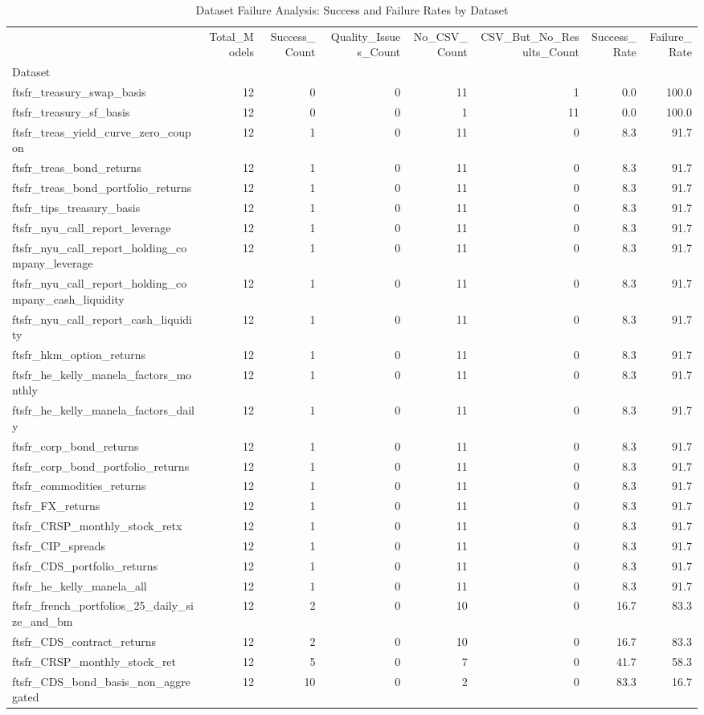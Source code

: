 \begin{table}
\caption{Dataset Failure Analysis: Success and Failure Rates by Dataset}
\label{tab:dataset_failures}
\begin{tabular}{lrrrrrrr}
\toprule
 & Total_Models & Success_Count & Quality_Issues_Count & No_CSV_Count & CSV_But_No_Results_Count & Success_Rate & Failure_Rate \\
Dataset &  &  &  &  &  &  &  \\
\midrule
ftsfr_treasury_swap_basis & 12 & 0 & 0 & 11 & 1 & 0.0 & 100.0 \\
ftsfr_treasury_sf_basis & 12 & 0 & 0 & 1 & 11 & 0.0 & 100.0 \\
ftsfr_treas_yield_curve_zero_coupon & 12 & 1 & 0 & 11 & 0 & 8.3 & 91.7 \\
ftsfr_treas_bond_returns & 12 & 1 & 0 & 11 & 0 & 8.3 & 91.7 \\
ftsfr_treas_bond_portfolio_returns & 12 & 1 & 0 & 11 & 0 & 8.3 & 91.7 \\
ftsfr_tips_treasury_basis & 12 & 1 & 0 & 11 & 0 & 8.3 & 91.7 \\
ftsfr_nyu_call_report_leverage & 12 & 1 & 0 & 11 & 0 & 8.3 & 91.7 \\
ftsfr_nyu_call_report_holding_company_leverage & 12 & 1 & 0 & 11 & 0 & 8.3 & 91.7 \\
ftsfr_nyu_call_report_holding_company_cash_liquidity & 12 & 1 & 0 & 11 & 0 & 8.3 & 91.7 \\
ftsfr_nyu_call_report_cash_liquidity & 12 & 1 & 0 & 11 & 0 & 8.3 & 91.7 \\
ftsfr_hkm_option_returns & 12 & 1 & 0 & 11 & 0 & 8.3 & 91.7 \\
ftsfr_he_kelly_manela_factors_monthly & 12 & 1 & 0 & 11 & 0 & 8.3 & 91.7 \\
ftsfr_he_kelly_manela_factors_daily & 12 & 1 & 0 & 11 & 0 & 8.3 & 91.7 \\
ftsfr_corp_bond_returns & 12 & 1 & 0 & 11 & 0 & 8.3 & 91.7 \\
ftsfr_corp_bond_portfolio_returns & 12 & 1 & 0 & 11 & 0 & 8.3 & 91.7 \\
ftsfr_commodities_returns & 12 & 1 & 0 & 11 & 0 & 8.3 & 91.7 \\
ftsfr_FX_returns & 12 & 1 & 0 & 11 & 0 & 8.3 & 91.7 \\
ftsfr_CRSP_monthly_stock_retx & 12 & 1 & 0 & 11 & 0 & 8.3 & 91.7 \\
ftsfr_CIP_spreads & 12 & 1 & 0 & 11 & 0 & 8.3 & 91.7 \\
ftsfr_CDS_portfolio_returns & 12 & 1 & 0 & 11 & 0 & 8.3 & 91.7 \\
ftsfr_he_kelly_manela_all & 12 & 1 & 0 & 11 & 0 & 8.3 & 91.7 \\
ftsfr_french_portfolios_25_daily_size_and_bm & 12 & 2 & 0 & 10 & 0 & 16.7 & 83.3 \\
ftsfr_CDS_contract_returns & 12 & 2 & 0 & 10 & 0 & 16.7 & 83.3 \\
ftsfr_CRSP_monthly_stock_ret & 12 & 5 & 0 & 7 & 0 & 41.7 & 58.3 \\
ftsfr_CDS_bond_basis_non_aggregated & 12 & 10 & 0 & 2 & 0 & 83.3 & 16.7 \\
\bottomrule
\end{tabular}
\end{table}
